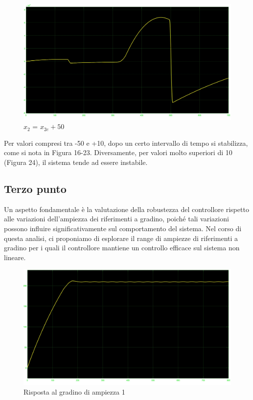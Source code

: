 \documentclass[a4paper, 11pt]{article}
\begin{document}
\vspace{0.5cm}

\begin{figure}[!h]
    \centering
    \includegraphics[scale=0.2]{punto_2/x2+50.jpg}
    \caption{$x_2$ = $x_{2e} + 50$}
    \label{fig:enter-label}
\end{figure}

\clearpage

Per valori compresi tra -50 e +10, dopo un certo intervallo di tempo si stabilizza, come si nota in Figura 16-23. Diversamente, per valori molto superiori di 10 (Figura 24), il sistema tende ad essere instabile.

\subsection{Terzo punto}
Un aspetto fondamentale è la valutazione della robustezza del controllore rispetto alle variazioni dell'ampiezza dei riferimenti a gradino, poiché tali variazioni possono influire significativamente sul comportamento del sistema. Nel corso di questa analisi, ci proponiamo di esplorare il range di ampiezze di riferimenti a gradino per i quali il controllore mantiene un controllo efficace sul sistema non lineare.

\begin{figure}[!h]
    \centering
    \includegraphics[scale=0.2]{Step_nonLineare/Step1_noLin.jpg}
    \caption{Risposta al gradino di ampiezza 1}
    \label{fig:enter-label}
\end{figure}
\end{document}
